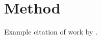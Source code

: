 \section{Method}
\label{sect:method}

Example citation of  work by \citet{feraru_towards_2020}.

\lipsum[2-4]